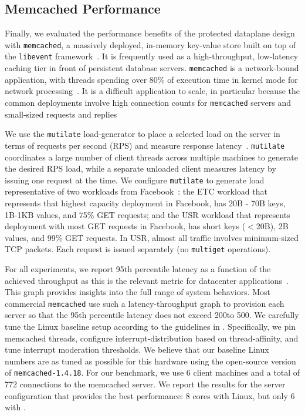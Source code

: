 
\subsection{Memcached Performance}
\label{sec:eval:memcached}




Finally, we evaluated the performance benefits of the \ix protected
dataplane design with \texttt{memcached}, a massively deployed,
in-memory key-value store built on top of the \texttt{libevent}
framework~\cite{url:memcached}. It is frequently used as a
high-throughput, low-latency caching tier in front of persistent
database servers. \texttt{memcached} is a network-bound application,
with threads spending over 80\% of execution time in kernel mode for
network processing~\cite{Leverich:RHSU:2014}. It is a difficult
application to scale, in particular because the common deployments
involve high connection counts for \texttt{memcached} servers and
small-sized requests and
replies~\cite{nishtala2013scaling,Atikoglu:2012:WAL}

We use the \texttt{mutilate} load-generator to place a selected load
on the server in terms of requests per second (RPS) and measure
response latency~\cite{url:mutilate}. \texttt{mutilate} coordinates a
large number of client threads across multiple machines to generate
the desired RPS load, while a separate unloaded client measures
latency by issuing one request at the time.  We configure
\texttt{mutilate} to generate load representative of two workloads
from Facebook~\cite{Atikoglu:2012:WAL}: the ETC workload that
represents that highest capacity deployment in Facebook, has 20B - 70B
keys, 1B-1KB values, and 75\% GET requests; and the USR workload that
represents deployment with most GET requests in Facebook, has short
keys ($<$20B), 2B values, and 99\% GET requests. In USR, almost all
traffic involves minimum-sized TCP packets. Each request is issued
separately (no \texttt{multiget} operations).

  For all experiments, we report 95th percentile latency as
a function of the achieved throughput as this is the relevant metric
for datacenter applications~\cite{DBLP:journals/cacm/DeanB13}. This
graph provides insights into the full range of system behaviors. Most
commercial \texttt{memcached} use such a latency-throughput graph to
provision each server so that the 95th percentile latency does not
exceed 200\microsecond to 500\microsecond.  We carefully tune the Linux baseline setup
according to the guidelines in
\cite{Leverich:RHSU:2014}. Specifically, we pin memcached threads,
configure interrupt-distribution based on thread-affinity, and tune
interrupt moderation thresholds. We believe that our baseline Linux
numbers are as tuned as possible for this hardware using the
open-source version of \texttt{memcached-1.4.18}. For our benchmark,
we use 6 client machines and a total of 772 connections to the
memcached server.  We report the results for the
server configuration that provides the best performance: 8 cores with
Linux, but only 6 with \ix.

